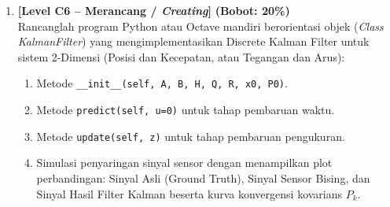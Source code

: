 \documentclass[11pt,a4paper]{article}
\begin{document}
\begin{enumerate}[leftmargin=1.5em, label=\textbf{Soal \arabic*.}]
    \vspace{0.4cm}

    \item \textbf{[Level C6 -- Merancang / \textit{Creating}]} \hfill \textbf{(Bobot: 20\%)} \\
    Rancanglah program Python atau Octave mandiri berorientasi objek (\textit{Class KalmanFilter}) yang mengimplementasikan Discrete Kalman Filter untuk sistem 2-Dimensi (Posisi dan Kecepatan, atau Tegangan dan Arus):
    \begin{enumerate}[label=\alph*.]
        \item Metode \texttt{\_\_init\_\_(self, A, B, H, Q, R, x0, P0)}.
        \item Metode \texttt{predict(self, u=0)} untuk tahap pembaruan waktu.
        \item Metode \texttt{update(self, z)} untuk tahap pembaruan pengukuran.
        \item Simulasi penyaringan sinyal sensor dengan menampilkan plot perbandingan: Sinyal Asli (Ground Truth), Sinyal Sensor Bising, dan Sinyal Hasil Filter Kalman beserta kurva konvergensi kovarians $P_k$.
    \end{enumerate}

\end{enumerate}
\end{document}
